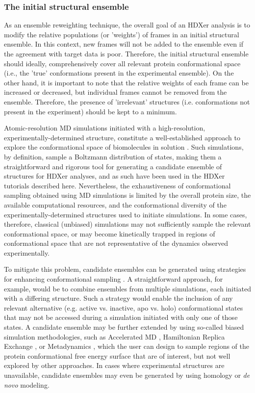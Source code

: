 \documentclass[9pt,tutorial]{livecoms}
\begin{document}
\subsubsection{The initial structural ensemble}\label{initialensemble_sect}
As an ensemble reweighting technique, the overall goal of an HDXer analysis is to modify the relative populations (or 'weights') of frames in an initial structural ensemble.
In this context, new frames will not be added to the ensemble even if the agreement with target data is poor. 
Therefore, the initial structural ensemble should ideally, comprehensively cover all relevant protein conformational space (i.e., the 'true' conformations present in the experimental ensemble).
On the other hand, it is important to note that the relative weights of each frame can be increased or decreased, but individual frames cannot be removed from the ensemble. 
Therefore, the presence of 'irrelevant' structures (i.e. conformations not present in the experiment) should be kept to a minimum.

Atomic-resolution MD simulations initiated with a high-resolution, experimentally-determined structure, constitute a well-established approach to explore the conformational space of biomolecules in solution \cite{Huggins2019}. 
Such simulations, by definition, sample a Boltzmann distribution of states, making them a straightforward and rigorous tool for generating a candidate ensemble of structures for HDXer analyses, and as such have been used in the HDXer tutorials described here.
Nevertheless, the exhaustiveness of conformational sampling obtained using MD simulations is limited by the overall protein size, the available computational resources, and the conformational diversity of the experimentally-determined structures used to initiate simulations.
In some cases, therefore, classical (unbiased) simulations may not sufficiently sample the relevant conformational space, or may become kinetically trapped in regions of conformational space that are not representative of the dynamics observed experimentally.

To mitigate this problem, candidate ensembles can be generated using strategies for enhancing conformational sampling \cite{Allison2020}.
A straightforward approach, for example, would be to combine ensembles from multiple simulations, each initiated with a differing structure.
Such a strategy would enable the inclusion of any relevant alternative (e.g. active vs. inactive, apo vs. holo) conformational states that may not be accessed during a simulation initiated with only one of those states.
A candidate ensemble may be further extended by using so-called biased simulation methodologies, such as Accelerated MD \cite{Hamelberg2004}, Hamiltonian Replica Exchange \cite{Fukunishi2002}, or Metadynamics \cite{Laio2002}, which the user can design to sample regions of the protein conformational free energy surface that are of interest, but not well explored by other approaches.
In cases where experimental structures are unavailable, candidate ensembles may even be generated by using homology or \textit{de novo} modeling.
\end{document}
